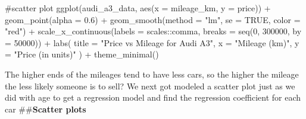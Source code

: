 \documentclass[
  letterpaper,
  DIV=11,
  numbers=noendperiod]{scrartcl}
\newenvironment{Shaded}{\begin{snugshade}}{\end{snugshade}}
\newcommand{\AttributeTok}[1]{\textcolor[rgb]{0.40,0.45,0.13}{#1}}
\newcommand{\CommentTok}[1]{\textcolor[rgb]{0.37,0.37,0.37}{#1}}
\newcommand{\ConstantTok}[1]{\textcolor[rgb]{0.56,0.35,0.01}{#1}}
\newcommand{\DecValTok}[1]{\textcolor[rgb]{0.68,0.00,0.00}{#1}}
\newcommand{\FloatTok}[1]{\textcolor[rgb]{0.68,0.00,0.00}{#1}}
\newcommand{\FunctionTok}[1]{\textcolor[rgb]{0.28,0.35,0.67}{#1}}
\newcommand{\NormalTok}[1]{\textcolor[rgb]{0.00,0.23,0.31}{#1}}
\newcommand{\SpecialCharTok}[1]{\textcolor[rgb]{0.37,0.37,0.37}{#1}}
\newcommand{\StringTok}[1]{\textcolor[rgb]{0.13,0.47,0.30}{#1}}
\begin{document}
\begin{Shaded}
\begin{Highlighting}[]
\CommentTok{\#scatter plot}
\FunctionTok{ggplot}\NormalTok{(audi\_a3\_data, }\FunctionTok{aes}\NormalTok{(}\AttributeTok{x =}\NormalTok{ mileage\_km, }\AttributeTok{y =}\NormalTok{ price)) }\SpecialCharTok{+}
  \FunctionTok{geom\_point}\NormalTok{(}\AttributeTok{alpha =} \FloatTok{0.6}\NormalTok{) }\SpecialCharTok{+}
  \FunctionTok{geom\_smooth}\NormalTok{(}\AttributeTok{method =} \StringTok{"lm"}\NormalTok{, }\AttributeTok{se =} \ConstantTok{TRUE}\NormalTok{, }\AttributeTok{color =} \StringTok{"red"}\NormalTok{) }\SpecialCharTok{+}
  \FunctionTok{scale\_x\_continuous}\NormalTok{(}\AttributeTok{labels =}\NormalTok{ scales}\SpecialCharTok{::}\NormalTok{comma, }\AttributeTok{breaks =} \FunctionTok{seq}\NormalTok{(}\DecValTok{0}\NormalTok{, }\DecValTok{300000}\NormalTok{, }\AttributeTok{by =} \DecValTok{50000}\NormalTok{)) }\SpecialCharTok{+}
  \FunctionTok{labs}\NormalTok{(}
    \AttributeTok{title =} \StringTok{"Price vs Mileage for Audi A3"}\NormalTok{,}
    \AttributeTok{x =} \StringTok{"Mileage (km)"}\NormalTok{,}
    \AttributeTok{y =} \StringTok{"Price (in units)"}
\NormalTok{  ) }\SpecialCharTok{+}
  \FunctionTok{theme\_minimal}\NormalTok{()}
\end{Highlighting}
\end{Shaded}

The higher ends of the mileages tend to have less cars, so the higher
the mileage the less likely someone is to sell? We next got modeled a
scatter plot just as we did with age to get a regression model and find
the regression coefficient for each car \#\#\textbf{Scatter plots}
\end{document}
